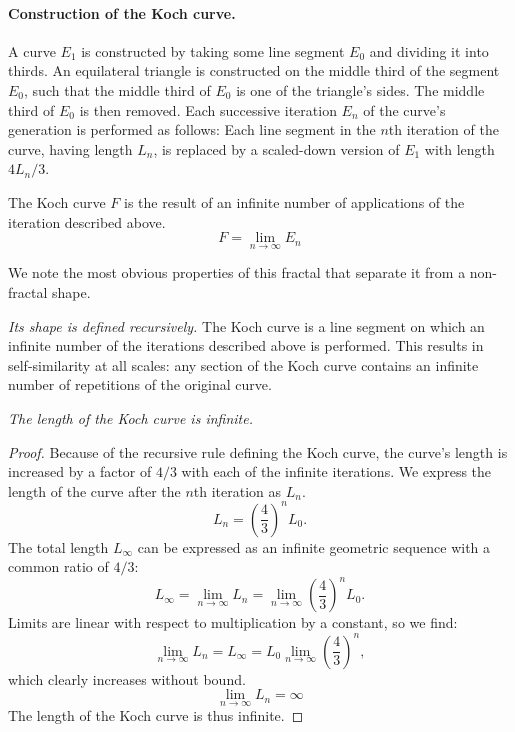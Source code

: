 \paragraph{Construction of the Koch curve.} A curve $E_1$ is constructed by taking some line segment $E_0$ and dividing it into thirds. An equilateral triangle is constructed on the middle third of the segment $E_0$, such that the middle third of $E_0$ is one of the triangle's sides. The middle third of $E_0$ is then removed. Each successive iteration $E_n$ of the curve's generation is performed as follows: Each line segment in the $n$th iteration of the curve, having length $L_n$, is replaced by a scaled-down version of $E_1$ with length $4L_n/3$. 

The Koch curve $F$ is the result of an infinite number of applications of the iteration described above.
\begin{equation}\label{limitofE_n}
	F = \lim_{n \to \infty}E_n
\end{equation}

We note the most obvious properties of this fractal that separate it from a non-fractal shape. 

\begin{myobs}\textit{Its shape is defined recursively.} The Koch curve is a line segment on which an infinite number of the iterations described above is performed. This results in self-similarity at all scales: any section of the Koch curve contains an infinite number of repetitions of the original curve.\end{myobs}

\begin{myobs}\textit{The length of the Koch curve is infinite.}\end{myobs}

\begin{proof}
Because of the recursive rule defining the Koch curve, the curve's length is increased by a factor of $ 4/3 $ with each of the infinite iterations. We express the length of the curve after the $n$th iteration as $L_n$. 
\begin{equation}
	L_n = \left(\frac{4}{3}\right)^n L_0.
\end{equation}
The total length $L_\infty$ can be expressed as an infinite geometric sequence with a common ratio of $ 4/3 $:
\begin{equation}
	L_\infty = \lim_{n \to \infty}L_n = \lim_{n \to \infty}\left(\frac{4}{3}\right)^n L_0.
\end{equation}
Limits are linear with respect to multiplication by a constant, so we find:
\begin{equation}
	\lim_{n \to \infty}L_n = L_\infty = L_0 \lim_{n \to \infty} \left(\frac{4}{3}\right)^n,
\end{equation}
which clearly increases without bound.
\begin{equation}
	\lim_{n \to \infty}L_n = \infty 
\end{equation}
The length of the Koch curve is thus infinite.
\end{proof}

